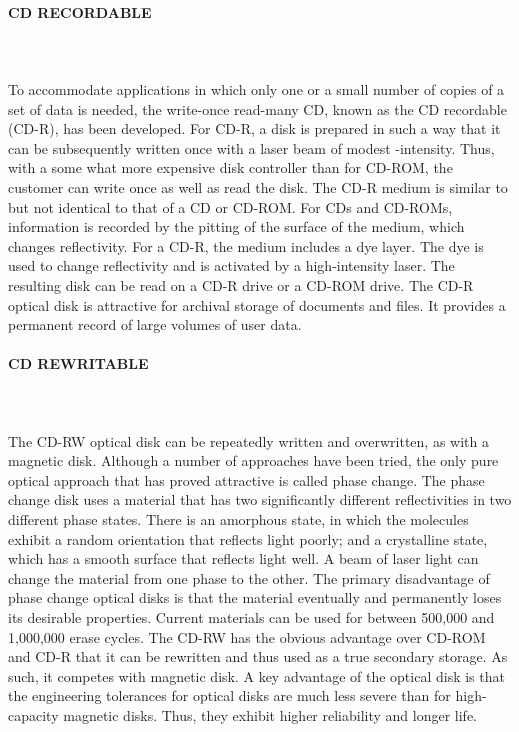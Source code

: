 \paragraph{CD RECORDABLE}\mbox{}\\\\%
To accommodate applications in which only one or a small
number of copies of a set of data is needed, the write-once read-many CD, known
as the CD recordable (CD-R), has been developed. For CD-R, a disk is prepared
in such a way that it can be subsequently written once with a laser beam of
modest -intensity. Thus, with a some what more expensive disk controller than for
CD-ROM, the customer can write once as well as read the disk.
The CD-R medium is similar to but not identical to that of a CD or
CD-ROM. For CDs and CD-ROMs, information is recorded by the pitting of
the surface of the medium, which changes reflectivity. For a CD-R, the medium
includes a dye layer. The dye is used to change reflectivity and is activated
by a high-intensity laser. The resulting disk can be read on a CD-R drive or a
CD-ROM drive.
The CD-R optical disk is attractive for archival storage of documents and files.
It provides a permanent record of large volumes of user data.
\paragraph{ CD REWRITABLE }\mbox{}\\\\%
The CD-RW optical disk can be repeatedly written and
overwritten, as with a magnetic disk. Although a number of approaches have been
tried, the only pure optical approach that has proved attractive is called phase
change. The phase change disk uses a material that has two significantly different
reflectivities in two different phase states. There is an amorphous state, in which the
molecules exhibit a random orientation that reflects light poorly; and a crystalline
state, which has a smooth surface that reflects light well. A beam of laser light can
change the material from one phase to the other. The primary disadvantage of
phase change optical disks is that the material eventually and permanently loses
its desirable properties. Current materials can be used for between 500,000 and
1,000,000 erase cycles.
The CD-RW has the obvious advantage over CD-ROM and CD-R that it can
be rewritten and thus used as a true secondary storage. As such, it competes with
magnetic disk. A key advantage of the optical disk is that the engineering tolerances
for optical disks are much less severe than for high-capacity magnetic disks. Thus,
they exhibit higher reliability and longer life.
